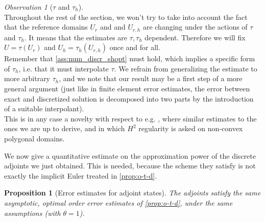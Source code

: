 \documentclass[english,a4paper,9pt,oneside]{scrbook}	%
\theoremstyle{break}
\newtheorem{prop}[equation]{Proposition}
\theoremstyle{remark}
\newtheorem{obs}[equation]{Observation}
\begin{document}
\begin{obs}[$\tau$ and $\tau_h$]
\label{obs:tau_vs_tau_h}
\mbox{}\\
Throughout the rest of the section, we won't try to take into account the fact that the reference domains $U_r$ and and $U_{r,h}$ are changing under the actions of $\tau$ and $\tau_h$. It means that the estimates are $\tau, \tau_h$ dependent. Therefore we will fix $U = \tau(U_r)$ and $U_h=\tau_h(U_{r,h})$ once and for all. \mbox{}\\


Remember that \cref{ass:num_discr_shopt} must hold, which implies a specific form of $\tau_h$, i.e. that it must interpolate $\tau$. We refrain from generalizing the estimate to more arbitrary $\tau_h$, and we note that our result may be a first step of a more general argument (just like in finite element error estimates, the error between exact and discretized solution is decomposed into two parts by the introduction of a suitable interpolant). \mbox{}\\

This is in any case a novelty with respect to e.g. \cite{paganini}, where similar estimates to the ones we are up to derive, and in which $H^2$ regularity is asked on non-convex polygonal domains. \mbox{}\\
\end{obs}

We now give a quantitative estimate on the approximation power of the discrete adjoints we just obtained. This is needed, because the scheme they satisfy is not exactly the implicit Euler treated in \cref{prop:o-t-d}.

\begin{prop}[Error estimates for adjoint states]
\label{prop:d-t-o_estimates}
The adjoints satisfy the same asymptotic, optimal order error estimates of \cref{prop:o-t-d}, under the same assumptions (with $\theta = 1$).
\end{prop}
\end{document}
